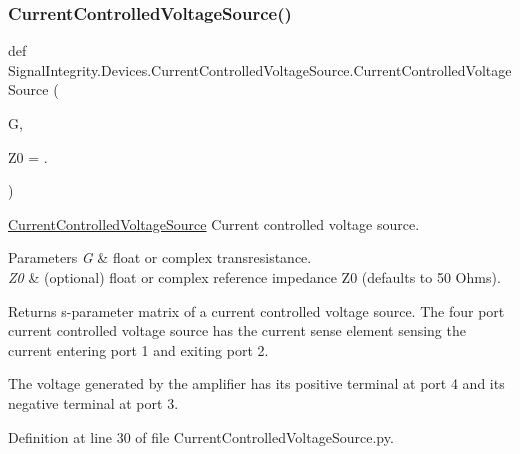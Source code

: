 \subsubsection{\texorpdfstring{Current\+Controlled\+Voltage\+Source()}{CurrentControlledVoltageSource()}}
{\footnotesize\ttfamily def Signal\+Integrity.\+Devices.\+Current\+Controlled\+Voltage\+Source.\+Current\+Controlled\+Voltage\+Source (\begin{DoxyParamCaption}\item[{}]{G,  }\item[{}]{Z0 = {.} }\end{DoxyParamCaption})}



\hyperlink{namespaceSignalIntegrity_1_1Devices_1_1CurrentControlledVoltageSource}{Current\+Controlled\+Voltage\+Source} Current controlled voltage source. 


\begin{DoxyParams}{Parameters}
{\em G} & float or complex transresistance. \\
\hline
{\em Z0} & (optional) float or complex reference impedance Z0 (defaults to 50 Ohms). \\
\hline
\end{DoxyParams}
\begin{DoxyReturn}{Returns}
s-\/parameter matrix of a current controlled voltage source. The four port current controlled voltage source has the current sense element sensing the current entering port 1 and exiting port 2.
\end{DoxyReturn}
The voltage generated by the amplifier has its positive terminal at port 4 and its negative terminal at port 3. 

Definition at line 30 of file Current\+Controlled\+Voltage\+Source.\+py.

